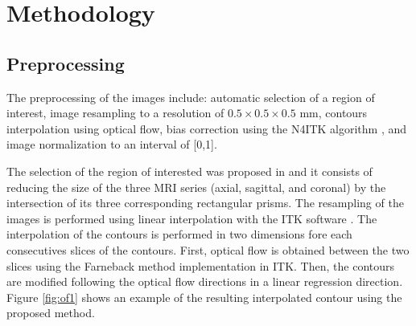 \section{Methodology}
\label{sec:methods}



\subsection{Preprocessing}
\label{subsec:prepro}
The preprocessing of the images include: automatic selection of a region
of interest, image resampling to a resolution of $0.5 \times 0.5 \times 0.5$ mm, contours interpolation
using optical flow, bias correction using the N4ITK algorithm \cite{n4itk}, and
image normalization to an interval of [0,1].

The selection of the region of interested was proposed in \cite{anneke} and it 
consists of reducing the size of the three MRI series (axial, sagittal, and coronal)
by the intersection of its three corresponding rectangular prisms. The resampling
of the images is performed using linear interpolation with the ITK software \cite{itk}. 
The interpolation of the contours is performed in two dimensions fore each consecutives slices
of the contours. First, optical flow is obtained between the two slices using the  
Farneback method implementation in ITK. Then, the contours are modified following
the optical flow directions in a linear regression direction. Figure \ref{fig:of1} shows an
example of the resulting interpolated contour using the proposed method. 
